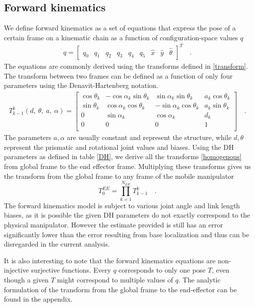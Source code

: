 \documentclass[times, utf8, diplomski, english]{fer}
\begin{document}
\subsection{Forward kinematics}\label{subsection:FK}
We define forward kinematics as a set of equations that express the pose of a certain frame on a kinematic chain as a function of configuration-space values $q$
\begin{align}\label{eq:config_matrix}
q = 
\begin{bmatrix}
q_0& q_1& q_2& q_3& q_4& q_5& \hat{x}& \hat{y}& \hat{\theta}
\end{bmatrix}^T \quad .
\end{align}
The equations are commonly derived using the transforms defined in \eqref{transform}.
The transform between two frames can be defined as a function of only four parameters using the Denavit-Hartenberg notation.
\begin{align}
T_{k-1}^k(d, \ \theta, \ a, \ \alpha)
=
\begin{bmatrix}
\cos\theta_{k}& -\cos\alpha_{k}\sin\theta_{k} & \sin\alpha_{k}\sin\theta_{k} & a_k\cos\theta_{k}\\
\sin\theta_{k}& \cos\alpha_{k}\cos\theta_{k} & -\sin\alpha_{k}\cos\theta_{k} & a_k\sin\theta_{k}\\
0 & \sin\alpha_{k} & \cos\alpha_{k} & d_{k}\\
0 & 0 & 0 & 1\\
\end{bmatrix} \quad .
\label{homogenous}
\end{align}
The parameters $a, \alpha$ are usually constant and represent the structure, while $d, \theta$ represent the prismatic and rotational joint values and biases.
Using the DH parameters as defined in table \ref{DH}, we derive all the transforms \eqref{homogenous} from global frame to the end effector frame.
Multiplying these transforms gives us the transform from the global frame to any frame of the mobile manipulator
\begin{equation}
T_{0}^{EE} = \prod_{k=1}^{N_{EE}} T_{k-1}^{k} \quad .
\label{FK}
\end{equation}
The forward kinematics model is subject to various joint angle and link length biases, as it is possible the given DH parameters do not exactly correspond to the physical manipulator.
However the estimate provided is still has an error significantly lower than the error resulting from base localization and thus can be disregarded in the current analysis.

It is also interesting to note that the forward kinematics equations are non-injective surjective functions. 
Every $q$ corresponds to only one pose $T$, even though a given $T$ might correspond to multiple values of $q$.
The analytic formulation of the transform from the global frame to the end-effector can be found in the appendix.
\end{document}
